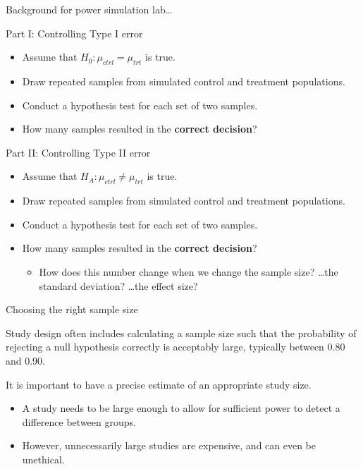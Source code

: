 \documentclass[
  ignorenonframetext,
  aspectratio=169]{beamer}
\providecommand{\tightlist}{%
  \setlength{\itemsep}{0pt}\setlength{\parskip}{0pt}}
\begin{document}
\begin{frame}{Background for power simulation lab\ldots{}}
\protect\hypertarget{background-for-power-simulation-lab}{}
\small

Part I: Controlling Type I error

\begin{itemize}
\item
  Assume that \(H_0: \mu_{ctrl} = \mu_{trt}\) is true.
\item
  Draw repeated samples from simulated control and treatment
  populations.
\item
  Conduct a hypothesis test for each set of two samples.
\item
  How many samples resulted in the \textbf{correct decision}?
\end{itemize}

Part II: Controlling Type II error

\begin{itemize}
\item
  Assume that \(H_A: \mu_{ctrl} \neq \mu_{trt}\) is true.
\item
  Draw repeated samples from simulated control and treatment
  populations.
\item
  Conduct a hypothesis test for each set of two samples.
\item
  How many samples resulted in the \textbf{correct decision}?

  \begin{itemize}
  \tightlist
  \item
    How does this number change when we change the sample size?
    \ldots the standard deviation? \ldots the effect size?
  \end{itemize}
\end{itemize}
\end{frame}

\begin{frame}{Choosing the right sample size}
\protect\hypertarget{choosing-the-right-sample-size}{}
\small

Study design often includes calculating a sample size such that the
probability of rejecting a null hypothesis correctly is acceptably
large, typically between 0.80 and 0.90.

It is important to have a precise estimate of an appropriate study size.

\begin{itemize}
\item
  A study needs to be large enough to allow for sufficient power to
  detect a difference between groups.
\item
  However, unnecessarily large studies are expensive, and can even be
  unethical.
\end{itemize}
\end{frame}
\end{document}
